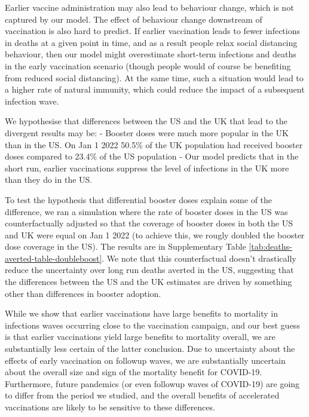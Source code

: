 \documentclass{article}
\begin{document}
Earlier vaccine administration may also lead to behaviour change, which is not captured by our model. The effect of behaviour change downstream of vaccination is also hard to predict. If earlier vaccination leads to fewer infections in deaths at a given point in time, and as a result people relax social distancing behaviour, then our model might overestimate short-term infections and deaths in the early vaccination scenario (though people would of course be benefiting from reduced social distancing). At the same time, such a situation would lead to a higher rate of natural immunity, which could reduce the impact of a subsequent infection wave.

We hypothesise that differences between the US and the UK that lead to the divergent results may be:
- Booster doses were much more popular in the UK than in the US. On Jan 1 2022 50.5\% of the UK population had received booster doses compared to 23.4\% of the US population \citep{mathieuCoronavirusPandemicCOVID192020}
- Our model predicts that in the short run, earlier vaccinations suppress the level of infections in the UK more than they do in the US.

To test the hypothesis that differential booster doses explain some of the difference, we ran a simulation where the rate of booster doses in the US was counterfactually adjusted so that the coverage of booster doses in both the US and UK were equal on Jan 1 2022 (to achieve this, we rougly doubled the booster dose coverage in the US). The results are in Supplementary Table \ref{tab:deaths-averted-table-doubleboost}. We note that this counterfactual doesn't drastically reduce the uncertainty over long run deaths averted in the US, suggesting that the differences between the US and the UK estimates are driven by something other than differences in booster adoption.

While we show that earlier vaccinations have large benefits to mortality in infections waves occurring close to the vaccination campaign, and our best guess is that earlier vaccinations yield large benefits to mortality overall, we are substantially less certain of the latter conclusion. Due to uncertainty about the effects of early vaccination on followup waves, we are substantially uncertain about the overall size and sign of the mortality benefit for COVID-19. Furthermore, future pandemics (or even followup waves of COVID-19) are going to differ from the period we studied, and the overall benefits of accelerated vaccinations are likely to be sensitive to these differences.
\end{document}
